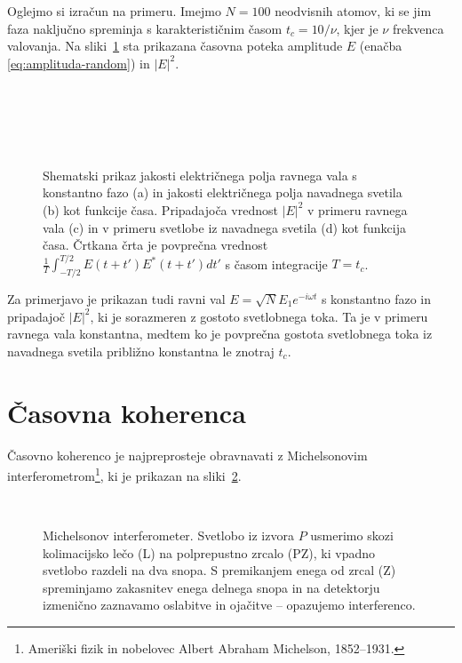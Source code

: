 Oglejmo si izračun
na primeru. Imejmo $N=100$ neodvisnih atomov, ki se jim faza naključno
spreminja s karakterističnim časom $t_{c}=10/\nu$, kjer je $\nu$
frekvenca valovanja. Na sliki~\ref{fig:amplituda-intenziteta} sta
prikazana časovna poteka amplitude $E$ (enačba \ref{eq:amplituda-random})
in $|E|^{2}$.
\begin{figure}
\centering
\def\svgwidth{140truemm} 
\\
\def\svgwidth{140truemm} 
\\
\def\svgwidth{140truemm} 
\\
\def\svgwidth{140truemm} 
\\
\caption{Shematski prikaz jakosti električnega polja 
ravnega vala s konstantno fazo (a) in jakosti električnega
polja navadnega svetila (b) kot funkcije časa. 
Pripadajoča vrednost $|E|^2$ v primeru ravnega vala (c) in 
v primeru svetlobe iz navadnega svetila (d) kot funkcija
časa. Črtkana črta je povprečna vrednost
$\frac{1}{T}\int_{-T/2}^{T/2}E(t+t')E^{*}(t+t')dt'$
s časom integracije $T=t_{c}$.}
\label{fig:amplituda-intenziteta}
\end{figure}
Za primerjavo je prikazan tudi ravni val $E=\sqrt{N}E_{1}e^{-i\omega t}$
s konstantno fazo in pripadajoč $|E|^{2}$, ki je sorazmeren z gostoto svetlobnega
toka. Ta je v primeru ravnega vala konstantna, medtem ko je povprečna gostota
svetlobnega toka iz navadnega svetila približno konstantna le znotraj $t_{c}$.

\section{Časovna koherenca}
\label{sec:casovna-koherenca}

Časovno koherenco je najpreprosteje obravnavati 
z Michelsonovim 
interferometrom\footnote{Ameriški fizik in nobelovec Albert Abraham Michelson, 1852--1931.},
ki je prikazan na sliki~\ref{fig:michelson}. 
\begin{figure}[!h]
\centering
\def\svgwidth{85truemm} 
\\
\caption{\label{fig:michelson}Michelsonov interferometer. Svetlobo
iz izvora $P$ usmerimo skozi kolimacijsko lečo (L) na polprepustno
zrcalo (PZ), ki vpadno svetlobo razdeli na dva snopa. S premikanjem 
enega od zrcal (Z) spreminjamo zakasnitev enega delnega snopa in
na detektorju izmenično zaznavamo oslabitve in ojačitve -- opazujemo interferenco.}
\end{figure}


